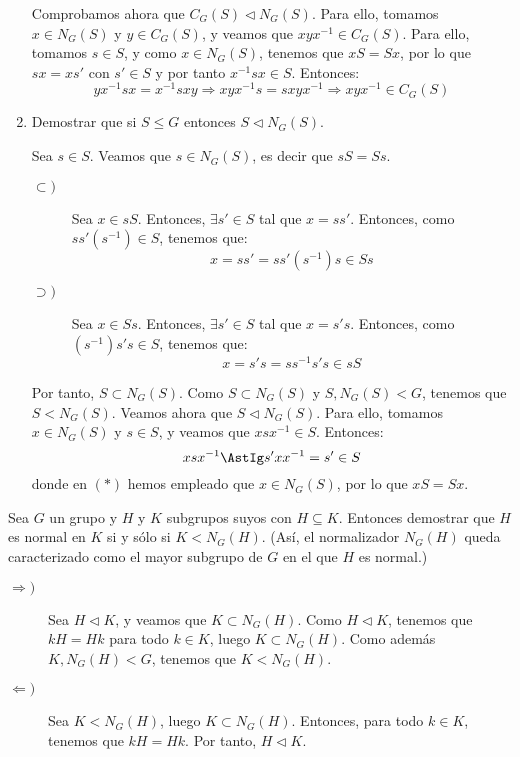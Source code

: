 \begin{ejercicio}
\begin{enumerate}
        Comprobamos ahora que $C_G(S)\lhd N_G(S)$. Para ello, tomamos $x\in N_G(S)$ y $y\in C_G(S)$, y veamos que $xyx^{-1}\in C_G(S)$. Para ello, tomamos $s\in S$, y como $x\in N_G(S)$, tenemos que $xS=Sx$, por lo que $sx = xs'$ con $s'\in S$ y por tanto $x^{-1}sx \in S$. Entonces:
        \begin{equation*}
            yx^{-1}sx = x^{-1}sxy
            \Longrightarrow xyx^{-1}s = sxyx^{-1}
            \Longrightarrow xyx^{-1}\in C_G(S)
        \end{equation*}
        \item Demostrar que si $S\leq G$ entonces $S\lhd N_G(S)$.
        
        Sea $s\in S$. Veamos que $s\in N_G(S)$, es decir que $sS=Ss$.
        \begin{description}
            \item[$\subset)$] Sea $x\in sS$. Entonces, $\exists s'\in S$ tal que $x=ss'$. Entonces, como $ss'(s^{-1})\in S$, tenemos que:
            \begin{equation*}
                x=ss'=ss'(s^{-1})s\in Ss
            \end{equation*}

            \item[$\supset)$] Sea $x\in Ss$. Entonces, $\exists s'\in S$ tal que $x=s's$. Entonces, como $(s^{-1})s's\in S$, tenemos que:
            \begin{equation*}
                x=s's=ss^{-1}s's\in sS
            \end{equation*}
        \end{description}

        Por tanto, $S\subset N_G(S)$. Como $S\subset N_G(S)$ y $S,N_G(S)< G$, tenemos que $S< N_G(S)$. Veamos ahora que $S\lhd N_G(S)$. Para ello, tomamos $x\in N_G(S)$ y $s\in S$, y veamos que $xsx^{-1}\in S$. Entonces:
        \begin{equation*}
            xsx^{-1} \AstIg s'xx^{-1}=s'\in S
        \end{equation*}
        donde en $(\ast)$ hemos empleado que $x\in N_G(S)$, por lo que $xS=Sx$.
    \end{enumerate}
\end{ejercicio}

\begin{ejercicio}
    Sea $G$ un grupo y $H$ y $K$ subgrupos suyos con $H\subseteq K$. Entonces demostrar que $H$ es normal en $K$ si y sólo si $K< N_G(H)$. (Así, el normalizador $N_G(H)$ queda caracterizado como el mayor subgrupo de $G$ en el que $H$ es normal.)
    \begin{description}
        \item[$\Longrightarrow)$]
        Sea $H\lhd K$, y veamos que $K\subset N_G(H)$. Como $H\lhd K$, tenemos que $kH=Hk$ para todo $k\in K$, luego $K\subset N_G(H)$. Como además $K,N_G(H)<G$, tenemos que $K<N_G(H)$.

        \item[$\Longleftarrow)$]
        Sea $K<N_G(H)$, luego $K\subset N_G(H)$. Entonces, para todo $k\in K$, tenemos que $kH=Hk$. Por tanto, $H\lhd K$.        
    \end{description}
\end{ejercicio}

